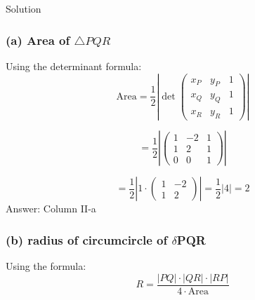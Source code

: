 \documentclass{beamer}
\newcommand{\myvec}[1]{\ensuremath{\begin{pmatrix}#1\end{pmatrix}}}
\begin{document}
\begin{frame}{Solution}
\subsubsection*{(a) Area of $\triangle PQR$}
Using the determinant formula:
\begin{equation}
	\text{Area} = \frac{1}{2}\left|\det\myvec{x_P & y_P & 1\\x_Q & y_Q & 1\\x_R & y_R & 1}\right|
\end{equation}

\begin{equation}
	= \frac{1}{2}\left|\myvec{1 & -2 & 1\\1 & 2 & 1\\0 & 0 & 1}\right|
\end{equation}

\begin{equation}
	= \frac{1}{2}\left|1 \cdot\myvec{1 & -2\\1 & 2}\right| = \frac{1}{2}|4| = 2
\end{equation}
Answer: Column II-a\\
\subsubsection*{(b) radius of circumcircle of $\delta$PQR}
Using the formula:
\begin{equation}
	R = \frac{|PQ| \cdot |QR| \cdot |RP|}{4 \cdot \text{Area}}
\end{equation}
\end{frame}
\end{document}
